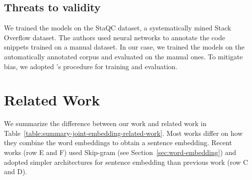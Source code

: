 \documentclass[sigconf]{acmart}
\begin{document}
\subsection{Threats to validity}

We trained the models on the StaQC dataset, a systematically mined Stack Overflow dataset. The authors used neural networks to annotate the code snippets trained on a manual dataset. In our case, we trained the models on the automatically annotated corpus and evaluated on the manual ones. To mitigate bias, we adopted \citet{iyer-etal-2016-summarizing}'s procedure for training and evaluation.

\section{Related Work}

We summarize the difference between our work and related work in Table~\ref{table:summary-joint-embedding-related-work}. Most works differ on how they combine the word embeddings to obtain a sentence embedding. Recent works (row E and F) used Skip-gram (see Section~\ref{sec:word-embedding}) and adopted simpler architectures for sentence embedding than previous work (row C and D).  
\end{document}
